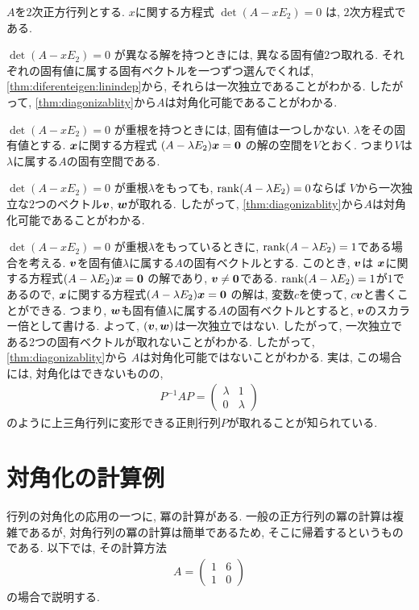\begin{remark}
  \label{rem:jordan}
  $A$を$2$次正方行列とする.
  $x$に関する方程式
  $\det(A-xE_2)=0$
  は, $2$次方程式である.
  
  $\det(A-xE_2)=0$
  が異なる解を持つときには,
  異なる固有値$2$つ取れる.
  それぞれの固有値に属する固有ベクトルを一つずつ選んでくれば,
  \cref{thm:diferenteigen:linindep}から,
  それらは一次独立であることがわかる.
  したがって,
  \cref{thm:diagonizablity}から$A$は対角化可能であることがわかる.

  $\det(A-xE_2)=0$
  が重根を持つときには,
  固有値は一つしかない.
  $\lambda$をその固有値とする.
  $\boldsymbol{x}$に関する方程式
  $(A-\lambda E_2)\boldsymbol{x}=\boldsymbol{0}$
  の解の空間を$V$とおく.
  つまり$V$は$\lambda$に属する$A$の固有空間である.

  $\det(A-xE_2)=0$
  が重根$\lambda$をもっても,
  $\operatorname{rank}(A-\lambda E_2)=0$ならば
  $V$から一次独立な$2$つのベクトル$\boldsymbol{v}$, $\boldsymbol{w}$が取れる.
  したがって,
  \cref{thm:diagonizablity}から$A$は対角化可能であることがわかる.

  $\det(A-xE_2)=0$
  が重根$\lambda$をもっているときに,
  $\operatorname{rank}(A-\lambda E_2)=1$である場合を考える.
  $\boldsymbol{v}$を固有値$\lambda$に属する$A$の固有ベクトルとする.
  このとき, $\boldsymbol{v}$は
  $\boldsymbol{x}$に関する方程式$(A-\lambda E_2)\boldsymbol{x}=\boldsymbol{0}$
  の解であり, $\boldsymbol{v}\neq \boldsymbol{0}$である.
  $\operatorname{rank}(A-\lambda E_2)=1$が$1$であるので,
  $\boldsymbol{x}$に関する方程式$(A-\lambda E_2)\boldsymbol{x}=\boldsymbol{0}$
  の解は, 変数$c$を使って, $c\boldsymbol{v}$と書くことができる.
  つまり, $\boldsymbol{w}$も固有値$\lambda$に属する$A$の固有ベクトルとすると,
  $\boldsymbol{v}$のスカラー倍として書ける.
  よって, $(\boldsymbol{v},\boldsymbol{w})$は一次独立ではない.
  したがって,
  一次独立である2つの固有ベクトルが取れないことがわかる.
  したがって,
  \cref{thm:diagonizablity}から
  $A$は対角化可能ではないことがわかる.
  実は, この場合には, 対角化はできないものの,
  \begin{align*}
    P^{-1}AP=\begin{pmatrix}\lambda&1\\0&\lambda \end{pmatrix}
  \end{align*}
  のように上三角行列に変形できる正則行列$P$が取れることが知られている.
\end{remark}



\section{対角化の計算例}
\label{ex:diagonalization}
行列の対角化の応用の一つに, 冪の計算がある.
一般の正方行列の冪の計算は複雑であるが,
対角行列の冪の計算は簡単であるため,
そこに帰着するというものである.
以下では,
その計算方法
\begin{align*}
A=\begin{pmatrix}1&6\\1&0\end{pmatrix}
\end{align*}
の場合で説明する.

